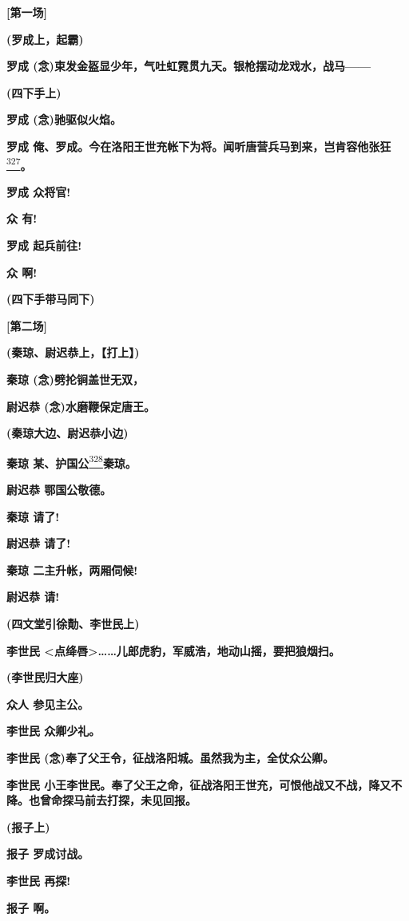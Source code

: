 \textbf{{[}第一场{]}}

\textbf{(罗成上，起霸)}

\textbf{罗成
(念)束发金盔显少年，气吐虹霓贯九天。银枪摆动龙戏水，战马------}

\textbf{(四下手上)}

\textbf{罗成 (念)驰驱似火焰。}

\textbf{罗成
俺、罗成。今在洛阳王世充帐下为将。闻听唐营兵马到来，岂肯容他张狂}\protect\hyperlink{fn327}{\textsuperscript{327}}\textbf{。}

\textbf{罗成 众将官!}

\textbf{众 有!}

\textbf{罗成 起兵前往!}

\textbf{众 啊!}

\textbf{(四下手带马同下)}

\textbf{{[}第二场{]}}

\textbf{(秦琼、尉迟恭上，【打上】)}

\textbf{秦琼 (念)劈抡锏盖世无双，}

\textbf{尉迟恭 (念)水磨鞭保定唐王。}

\textbf{(秦琼大边、尉迟恭小边)}

\textbf{秦琼
某、护国公}\protect\hyperlink{fn328}{\textsuperscript{328}}\textbf{秦琼。}

\textbf{尉迟恭 鄂国公敬德。}

\textbf{秦琼 请了!}

\textbf{尉迟恭 请了!}

\textbf{秦琼 二主升帐，两厢伺候!}

\textbf{尉迟恭 请!}

\textbf{(四文堂引徐勣、李世民上)}

\textbf{李世民
\textless{}点绛唇\textgreater{}\ldots{}\ldots{}儿郎虎豹，军威浩，地动山摇，要把狼烟扫。}

\textbf{(李世民归大座)}

\textbf{众人 参见主公。}

\textbf{李世民 众卿少礼。}

\textbf{李世民 (念)奉了父王令，征战洛阳城。虽然我为主，全仗众公卿。}

\textbf{李世民
小王李世民。奉了父王之命，征战洛阳王世充，可恨他战又不战，降又不降。也曾命探马前去打探，未见回报。}

\textbf{(报子上)}

\textbf{报子 罗成讨战。}

\textbf{李世民 再探!}

\textbf{报子 啊。}

